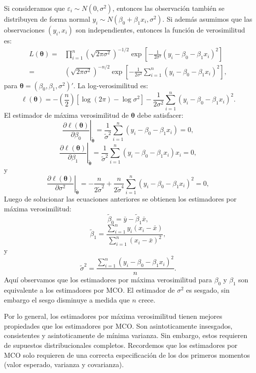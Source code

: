 \documentclass[
]{article}
\begin{document}
Si consideramos que \(\varepsilon_{i}\sim N(0,\sigma^{2})\), entonces las observación también se distribuyen de forma normal \(y_{i}\sim N(\beta_{0}+\beta_{1}x_{i},\sigma^{2})\). Si además asumimos que las observaciones \((y_{i},x_{i})\) son independientes, entonces la función de verosimilitud es:
\begin{equation}
\begin{split}
L(\boldsymbol \theta) =& \prod_{i=1}^{n} \left(\sqrt{2\pi\sigma^{2}} \right)^{-1/2}\exp\left[ - \frac{1}{2\sigma^{2}}(y_{i}-\beta_{0}-\beta_{1}x_{i})^{2} \right] \\
=& \left( \sqrt{2\pi\sigma^{2}} \right)^{-n/2}\exp\left[ - \frac{1}{2\sigma^{2}} \sum_{i=1}^{n}(y_{i}-\beta_{0}-\beta_{1}x_{i})^{2}\right],
\end{split}
\nonumber
\end{equation}
para \(\boldsymbol \theta=(\beta_{0},\beta_{1},\sigma^{2})'\). La log-verosimilitud es:
\[
\ell (\boldsymbol \theta) = - \left(\frac{n}{2}\right)\left[ \log (2 \pi) - \log \sigma^{2}\right] - \frac{1}{2\sigma^{2}}\sum_{i=1}^{n}(y_{i} - \beta_{0}-\beta_{1}x_{i})^{2}. 
\]
El estimador de máxima verosimilitud de \(\boldsymbol \theta\) debe satisfacer:
\[
\left. \frac{\partial \ell(\boldsymbol \theta)}{\partial \beta_{0}} \right|_{\widetilde{\boldsymbol \theta}} = \frac{1}{\widetilde{\sigma}^{2}}\sum_{i=1}^{n}(y_{i} - \beta_{0}-\beta_{1}x_{i}) = 0,
\]
\[
\left. \frac{\partial \ell(\boldsymbol \theta)}{\partial \beta_{1}} \right|_{\widetilde{\boldsymbol \theta}} = \frac{1}{\widetilde{\sigma}^{2}}\sum_{i=1}^{n}(y_{i} - \beta_{0}-\beta_{1}x_{i})x_{i} = 0,
\]
y
\[
\left. \frac{\partial \ell(\boldsymbol \theta)}{\partial \sigma^{2}} \right|_{\widetilde{\boldsymbol \theta}} = -\frac{n}{2\widetilde{\sigma}^{2}} + \frac{n}{2\widetilde{\sigma}^{4}}
\sum_{i=1}^{n}(y_{i} - \beta_{0}-\beta_{1}x_{i})^{2} = 0,
\]
Luego de solucionar las ecuaciones anteriores se obtienen los estimadores por máxima verosimilitud:
\[
\widetilde{\beta}_{0} = \bar{y} - \widetilde{\beta}_{1}\bar{x},
\]
\[
\widetilde{\beta}_{1} = \frac{\sum_{i=1}^{n}y_{i}(x_{i}-\bar{x})}{\sum_{i=1}^{n}(x_{i}-\bar{x})^{2}},
\]
y
\[
\widetilde{\sigma}^{2} = \frac{\sum_{i=1}^{n}(y_{i}-\beta_{0}-\beta_{1}x_{i})^{2}}{n}.
\]
Aquí observamos que los estimadores por máxima verosimilitud para \(\beta_{0}\) y \(\beta_{1}\) son equivalente a los estimadores por MCO. El estimador de \(\sigma^{2}\) es sesgado, sin embargo el sesgo disminuye a medida que \(n\) crece.

Por lo general, los estimadores por máxima verosimilitud tienen mejores propiedades que los estimadores por MCO. Son asintoticamente insesgados, consistentes y asintoticamente de mínima varianza. Sin embargo, estos requieren de supuestos distribucionales completos. Recordemos que los estimadores por MCO solo requieren de una correcta especificación de los dos primeros momentos (valor esperado, varianza y covarianza).
\end{document}
